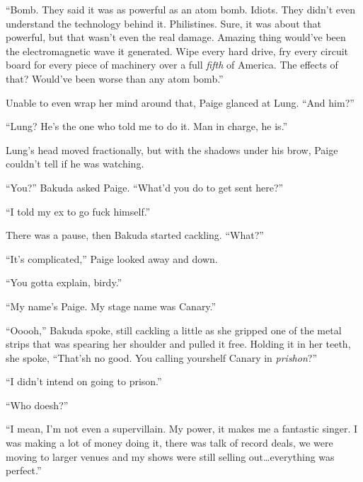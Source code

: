 ``Bomb.  They said it was as powerful as an atom bomb.  Idiots.  They didn't even understand the technology behind it.  Philistines.  Sure, it was about that powerful, but that wasn't even the real damage.  Amazing thing would've been the electromagnetic wave it generated.  Wipe every hard drive, fry every circuit board for every piece of machinery over a full \emph{fifth} of America.  The effects of that?  Would've been worse than any atom bomb.''



Unable to even wrap her mind around that, Paige glanced at Lung.  ``And him?''



``Lung?  He's the one who told me to do it.  Man in charge, he is.''



Lung's head moved fractionally, but with the shadows under his brow, Paige couldn't tell if he was watching.



``You?''  Bakuda asked Paige. ``What'd you do to get sent here?''



``I told my ex to go fuck himself.''



There was a pause, then Bakuda started cackling.  ``What?''



``It's complicated,'' Paige looked away and down.



``You gotta explain, birdy.''



``My name's Paige.  My stage name was Canary.''



``Ooooh,'' Bakuda spoke, still cackling a little as she gripped one of the metal strips that was spearing her shoulder and pulled it free.  Holding it in her teeth, she spoke, ``That'sh no good.  You calling yourshelf Canary in \emph{prishon}?''



``I didn't intend on going to prison.''



``Who doesh?''



``I mean, I'm not even a supervillain.  My power, it makes me a fantastic singer.  I was making a lot of money doing it, there was talk of record deals, we were moving to larger venues and my shows were still selling out\ldots everything was perfect.''



